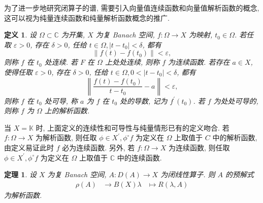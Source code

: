 \documentclass[openany]{ctexbook}
\theoremstyle{kaiti}
\newtheorem{definition}{定义}[section]
\newtheorem{theorem}{定理}[section]
\theoremstyle{normal}
\begin{document}
为了进一步地研究闭算子的谱, 需要引入向量值连续函数和向量值解析函数的概念, 这可以视为纯量连续函数和纯量解析函数概念的推广.

\begin{definition}
设 $\Omega \subset \mathbb{C}$ 为开集, $X$ 为复 Banach 空间, $f: \Omega \rightarrow X$ 为映射, $t_0 \in \Omega$. 若任取 $\varepsilon>0$, 存在 $\delta>0$, 任给 $t \in \Omega,\left|t-t_0\right|<\delta$, 都有
$$
\left\|f(t)-f\left(t_0\right)\right\|<\varepsilon,
$$
则称 $f$ 在 $t_0$ 处连续. 若 $F$ 在 $\Omega$ 上处处连续, 则称 $f$ 为连续函数. 若存在 $a \in X$, 使得任取 $\varepsilon>0$, 存在 $\delta>0$, 任给 $t \in \Omega, 0<\left|t-t_0\right|<\delta$, 都有
$$
\left\|\frac{f(t)-f\left(t_0\right)}{t-t_0}-a\right\|<\varepsilon,
$$
则称 $f$ 在 $t_0$ 处可导, 称 $a$ 为 $f$ 在 $t_0$ 处的导数, 记为 $f^{\prime}\left(t_0\right)$. 若 $f$ 为处处可导的, 则称 $f$ 为 $\Omega$ 上的解析函数.
\end{definition}

当 $X=\mathbb{K}$ 时, 上面定义的连续性和可导性与纯量情形已有的定义吻合. 若 $f: \Omega \rightarrow X$ 为解析函数, 则任取 $\phi \in X^{\prime}, \phi^{\circ} f$ 为定义在 $\Omega$ 上取值于 $C$ 中的解析函数, 由定义易证此时 $f$ 必为连续函数. 另外, 若 $f: \Omega \rightarrow X$ 为连续函数, 则任取 $\phi \in X^{\prime}, \phi^{\circ} f$ 为定义在 $\Omega$ 上取值于 $\mathbb{C}$ 中的连续函数.

\begin{theorem}
设 $X$ 为复 Banach 空间, $A: D(A) \rightarrow X$ 为闭线性算子. 则 $A$ 的预解式
$$
  \begin{aligned}
    \rho(A) &\rightarrow B(X)
    \lambda &\mapsto R(\lambda, A)
  \end{aligned}
$$
为解析函数.
\end{theorem}
\end{document}
